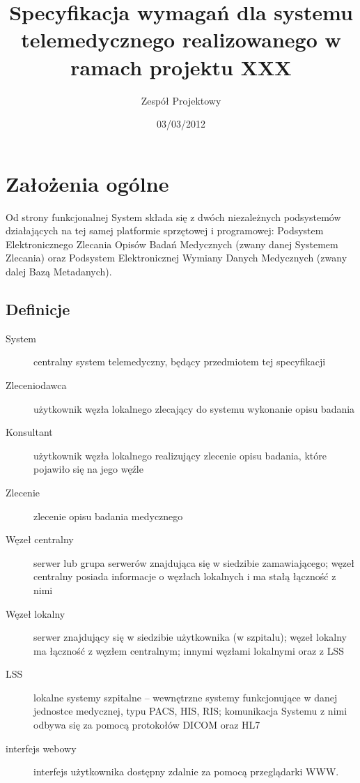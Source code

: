 \documentclass[a4paper]{report}
\begin{document}
\title{Specyfikacja wymagań dla systemu telemedycznego realizowanego w ramach projektu XXX}
\author{Zespół Projektowy}
\date{03/03/2012}
\maketitle

\tableofcontents

\chapter{Założenia ogólne}

Od strony funkcjonalnej System składa się z dwóch niezależnych podsystemów działających na tej samej platformie sprzętowej i programowej: Podsystem Elektronicznego Zlecania Opisów Badań Medycznych (zwany danej Systemem Zlecania) oraz Podsystem Elektronicznej Wymiany Danych Medycznych (zwany dalej Bazą Metadanych).

\section{Definicje}

\begin{description}
\item[System] centralny system telemedyczny, będący przedmiotem tej specyfikacji
\item[Zleceniodawca] użytkownik węzła lokalnego zlecający do systemu wykonanie opisu badania
\item[Konsultant] użytkownik węzła lokalnego realizujący zlecenie opisu badania, które pojawiło się na jego węźle
\item[Zlecenie] zlecenie opisu badania medycznego
\item[Węzeł centralny] serwer lub grupa serwerów znajdująca się w siedzibie zamawiającego; węzeł centralny posiada informacje o węzłach lokalnych i ma stałą łączność z nimi
\item[Węzeł lokalny] serwer znajdujący się w siedzibie użytkownika (w szpitalu); węzeł lokalny ma łączność z węzłem centralnym; innymi węzłami lokalnymi oraz z LSS
\item[LSS] lokalne systemy szpitalne -- wewnętrzne systemy funkcjonujące w danej jednostce medycznej, typu PACS, HIS, RIS; komunikacja Systemu z nimi odbywa się za pomocą protokołów DICOM oraz HL7
\item[interfejs webowy] interfejs użytkownika dostępny zdalnie za pomocą przeglądarki WWW.
\end{description}
\end{document}
